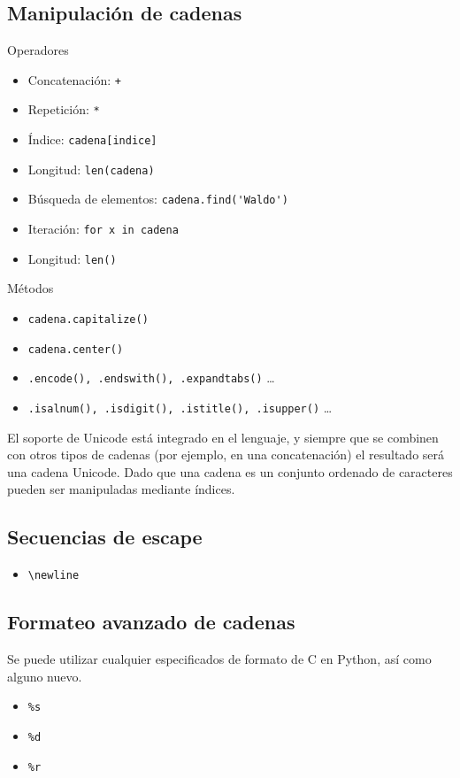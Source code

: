 \documentclass[12pt]{article} %
\begin{document}
\subsection{Manipulación de cadenas}
{\Large Operadores}
\begin{itemize}
	\item Concatenación: \verb|+|
	\item Repetición: \verb+*+
	\item Índice: \verb+cadena[indice]+
	\item Longitud: \verb+len(cadena)+
	\item Búsqueda de elementos: \verb+cadena.find('Waldo')+
	\item Iteración: \verb+for x in cadena+
	\item Longitud: \verb+len()+
\end{itemize}

{\Large Métodos}
\begin{itemize}
	\item \verb+cadena.capitalize()+
	\item \verb+cadena.center()+
	\item \verb+.encode(), .endswith(), .expandtabs()+ \dots
	\item \verb+.isalnum(), .isdigit(), .istitle(), .isupper()+ \dots
\end{itemize}


El soporte de Unicode está integrado en el lenguaje, y siempre que se combinen con otros tipos de cadenas (por ejemplo, en una concatenación) el resultado será una cadena Unicode.
Dado que una cadena es un conjunto ordenado de caracteres pueden ser manipuladas mediante índices.

\subsection{Secuencias de escape}
\begin{itemize}
	\item \verb+\newline+
\end{itemize}

\subsection{Formateo avanzado de cadenas}
Se puede utilizar cualquier especificados de formato de C en Python, así como alguno nuevo.
\begin{itemize}
	\item \verb+%s+
	\item \verb+%d+
	\item \verb+%r+
\end{itemize}
\end{document}
